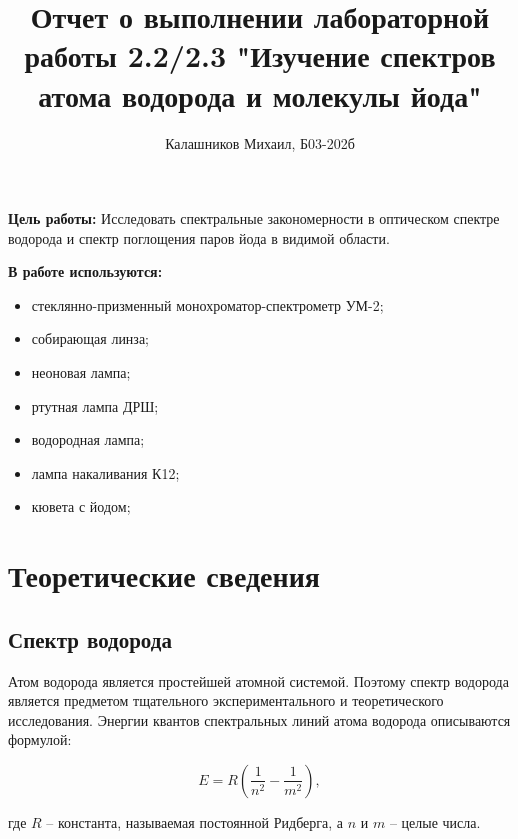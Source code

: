 \documentclass[14pt, a4paper]{report}
\title{\textbf{Отчет о выполнении лабораторной работы 2.2/2.3 "Изучение спектров атома водорода и молекулы йода"}}
\author{Калашников Михаил, Б03-202б}
\date{}
\begin{document}
\maketitle

\textbf{Цель работы:}
Исследовать спектральные закономерности в оптическом спектре водорода и спектр поглощения паров йода в видимой области.
\newline


\textbf{В работе используются:}
\begin{itemize}
\item стеклянно-призменный монохроматор-спектрометр УМ-2;
\item собирающая линза;
\item неоновая лампа;
\item ртутная лампа ДРШ;    
\item водородная лампа;
\item лампа накаливания К12;
\item кювета с йодом;
\end{itemize}

\section{Теоретические сведения}

\subsection{Спектр водорода}

Атом водорода является простейшей атомной системой. Поэтому спектр водорода является предметом тщательного экспериментального и теоретического исследования. Энергии квантов спектральных линий атома водорода описываются формулой:

\[E=R(\frac{1}{n^2}-\frac{1}{m^2}),\]

где $R$ -- константа, называемая постоянной Ридберга, а $n$ и $m$ -- целые числа.
\end{document}

